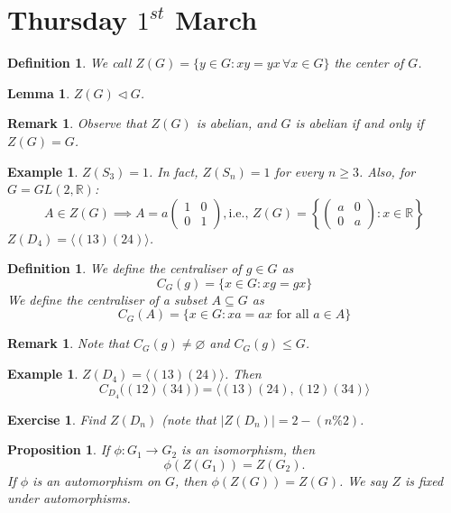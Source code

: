 \documentclass[a4paper,10pt]{article}
\newcommand{\RR}{\mathbb{R}}
\newtheorem{Def}[thm]{Definition}
\newtheorem{prop}[thm]{Proposition}
\newtheorem{eg}[thm]{Example}
\newtheorem{Ex}[thm]{Exercise}
\newtheorem{Lem}[thm]{Lemma}
\newtheorem{rem}[thm]{Remark}
\begin{document}
\section{Thursday $1^{st}$ March}
\begin{Def}
We call $Z(G) = \{ y \in G : xy = yx \, \forall x \in G \}$ the center of $G$.
\end{Def}
\begin{Lem}
$Z(G) \triangleleft G$.
\end{Lem}
\begin{rem}
Observe that $Z(G)$ is abelian, and $G$ is abelian if and only if $Z(G) = G$.
\end{rem}
\begin{eg}
$Z(S_3) = 1$. In fact, $Z(S_n) = 1$ for every $n \geq 3$. Also, for $G = GL(2, \RR)$:
\[ A \in Z(G) \implies A = a \begin{pmatrix} 1 & 0 \\ 0 & 1 \end{pmatrix}, \text{i.e., } Z(G) = \left\{ \begin{pmatrix} a & 0 \\ 0 & a \end{pmatrix} : x \in \RR \right\}  \]
$Z(D_4) = \langle (13)(24) \rangle$. 
\end{eg}
\begin{Def}
We define the centraliser of $g \in G$ as 
\[ C_G(g) = \{ x \in G : xg = gx \} \]
We define the centraliser of a subset $A \subseteq G$ as 
\[ C_G(A) = \{ x \in G : xa = ax \text{ for all } a \in A \} \]
\end{Def}
\begin{rem}
Note that $C_G(g) \neq \varnothing$ and $C_G(g) \leq G$. 
\end{rem}
\begin{eg}
$Z(D_4) = \langle (13)(24) \rangle$. Then
\[ C_{D_4} \big( (12)(34) \big) = \langle (13)(24), (12)(34) \rangle \]
\end{eg}
\begin{Ex}
Find $Z(D_n)$ (note that $|Z(D_n)| = 2 - (n \% 2)$.
\end{Ex}
\begin{prop}
If $\phi: G_1 \rightarrow G_2$ is an isomorphism, then
\[ \phi(Z(G_1)) = Z(G_2). \]
If $\phi$ is an automorphism on $G$, then $\phi(Z(G)) = Z(G)$. We say $Z$ is fixed under automorphisms. 
\end{prop}
\end{document}
